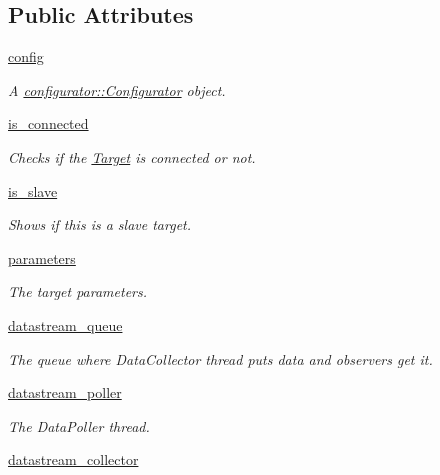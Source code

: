 \subsection*{\-Public \-Attributes}
\begin{DoxyCompactItemize}
\item 
\hyperlink{classpyrtai_1_1target_1_1_target_a81312c5e774f702d956b5e21f76b8d48}{config}
\begin{DoxyCompactList}\small\item\em \-A \hyperlink{classpyrtai_1_1configurator_1_1_configurator}{configurator\-::\-Configurator} object. \end{DoxyCompactList}\item 
\hyperlink{classpyrtai_1_1target_1_1_target_a615b77c2475db26f9055078ab7f15f75}{is\-\_\-connected}
\begin{DoxyCompactList}\small\item\em \-Checks if the \hyperlink{classpyrtai_1_1target_1_1_target}{\-Target} is connected or not. \end{DoxyCompactList}\item 
\hyperlink{classpyrtai_1_1target_1_1_target_a38d056a202885bac1459328108d600fa}{is\-\_\-slave}
\begin{DoxyCompactList}\small\item\em \-Shows if this is a slave target. \end{DoxyCompactList}\item 
\hyperlink{classpyrtai_1_1target_1_1_target_aae04036f71a3a512b5461bf97692e7e9}{parameters}
\begin{DoxyCompactList}\small\item\em \-The target parameters. \end{DoxyCompactList}\item 
\hyperlink{classpyrtai_1_1target_1_1_target_a0d458e6387a385c285b33a87e645caee}{datastream\-\_\-queue}
\begin{DoxyCompactList}\small\item\em \-The queue where \-Data\-Collector thread puts data and observers get it. \end{DoxyCompactList}\item 
\hyperlink{classpyrtai_1_1target_1_1_target_a6f53ef231f9caced4bc8ee94404f4550}{datastream\-\_\-poller}
\begin{DoxyCompactList}\small\item\em \-The \-Data\-Poller thread. \end{DoxyCompactList}\item 
\hyperlink{classpyrtai_1_1target_1_1_target_a2e3d692af2e90764b0835991cf538568}{datastream\-\_\-collector}

\end{DoxyCompactItemize}
